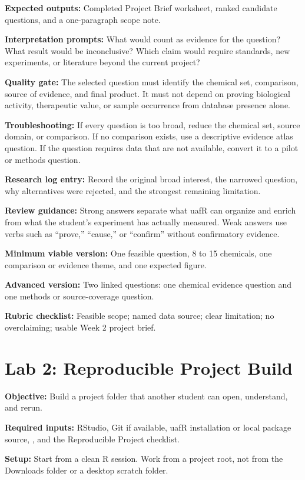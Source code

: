 \textbf{Expected outputs:} Completed Project Brief worksheet, ranked candidate questions, and a one-paragraph scope note.

\textbf{Interpretation prompts:} What would count as evidence for the question? What result would be inconclusive? Which claim would require standards, new experiments, or literature beyond the current project?

\textbf{Quality gate:} The selected question must identify the chemical set, comparison, source of evidence, and final product. It must not depend on proving biological activity, therapeutic value, or sample occurrence from database presence alone.

\textbf{Troubleshooting:} If every question is too broad, reduce the chemical set, source domain, or comparison. If no comparison exists, use a descriptive evidence atlas question. If the question requires data that are not available, convert it to a pilot or methods question.

\textbf{Research log entry:} Record the original broad interest, the narrowed question, why alternatives were rejected, and the strongest remaining limitation.

\textbf{Review guidance:} Strong answers separate what uafR can organize and enrich from what the student's experiment has actually measured. Weak answers use verbs such as ``prove,'' ``cause,'' or ``confirm'' without confirmatory evidence.

\textbf{Minimum viable version:} One feasible question, 8 to 15 chemicals, one comparison or evidence theme, and one expected figure.

\textbf{Advanced version:} Two linked questions: one chemical evidence question and one methods or source-coverage question.

\textbf{Rubric checklist:} Feasible scope; named data source; clear limitation; no overclaiming; usable Week 2 project brief.

\section{Lab 2: Reproducible Project Build}
\textbf{Objective:} Build a project folder that another student can open, understand, and rerun.

\textbf{Required inputs:} RStudio, Git if available, uafR installation or local package source, , and the Reproducible Project checklist.

\textbf{Setup:} Start from a clean R session. Work from a project root, not from the Downloads folder or a desktop scratch folder.

